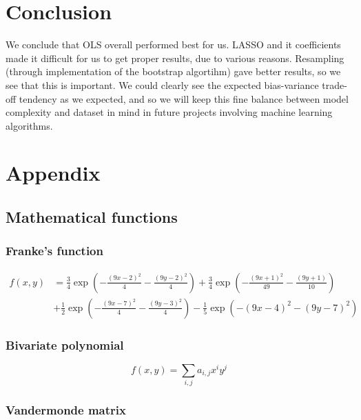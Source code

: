 \documentclass[a4paper]{article}
\begin{document}
\section{Conclusion}

We conclude that OLS overall performed best for us. LASSO and it coefficients made it difficult for us to get proper results, due to various reasons. Resampling (through implementation of the bootstrap algortihm) gave better results, so we see that this is important.
 We could clearly see the expected bias-variance trade-off tendency as we expected, and so we will keep this fine balance between model complexity and dataset in mind in future projects involving machine learning algorithms. 

\section{Appendix}

\subsection{Mathematical functions}

\subsubsection{Franke's function}

\begin{align}
f(x,y) &= \frac{3}{4}\exp{\left(-\frac{(9x-2)^2}{4} - \frac{(9y-2)^2}{4}\right)}+\frac{3}{4}\exp{\left(-\frac{(9x+1)^2}{49}- \frac{(9y+1)}{10}\right)} \nonumber \\
&+\frac{1}{2}\exp{\left(-\frac{(9x-7)^2}{4} - \frac{(9y-3)^2}{4}\right)} -\frac{1}{5}\exp{\left(-(9x-4)^2 - (9y-7)^2\right) } \label{eq:Franke}
\end{align}

\subsubsection{Bivariate polynomial}

\begin{equation}
f(x,y) = \sum_{i,j} a_{i,j} x^{i} y^{j} \label{eq:bivPoly}
\end{equation}

\subsubsection{Vandermonde matrix}
\end{document}
